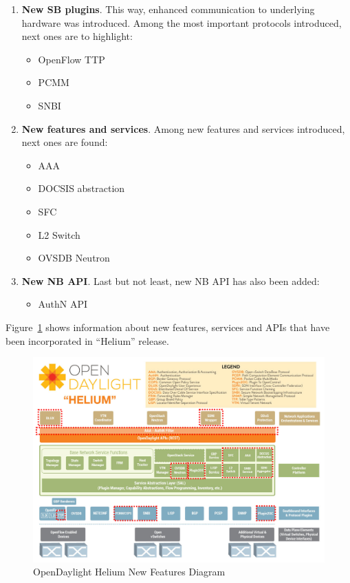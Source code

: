 \documentclass[a4paper, 12pt]{book}
\begin{document}
\begin{enumerate}\itemsep0pt
\item{\textbf{New SB plugins}}. This way, enhanced communication to underlying hardware was introduced. Among the most important protocols introduced, next ones are to highlight:
\begin{itemize}\itemsep0pt
\item{OpenFlow TTP}
\item{PCMM}
\item{SNBI}
\end{itemize}
\item{\textbf{New features and services}}. Among new features and services introduced, next ones are found:
\begin{itemize}\itemsep0pt
\item{AAA}
\item{DOCSIS abstraction}
\item{SFC}
\item{L2 Switch}
\item{OVSDB Neutron}
\end{itemize}
\item{\textbf{New NB API}}. Last but not least, new NB API has also been added:
\begin{itemize}\itemsep0pt
\item{AuthN API}
\end{itemize}
\end{enumerate}
Figure~\ref{fig:odl_tech_helium_new_diagram} shows information about new features, services and APIs that have been incorporated in ``Helium'' release.
\begin{center}
 \begin{figure}
 \begin{center}
   \includegraphics[width=15cm]{img/odl-technologies-02.png}
   \caption{OpenDaylight Helium New Features Diagram}
   \label{fig:odl_tech_helium_new_diagram}
 \end{center}
 \end{figure}
\end{center}
\end{document}
